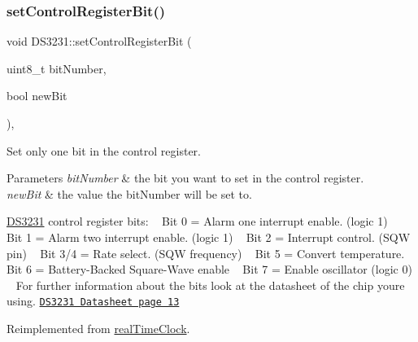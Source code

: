 \mbox{\label{class_d_s3231_a9ed1255adb58ecd03a541a4d481496c4}} 
\subsubsection{\texorpdfstring{set\+Control\+Register\+Bit()}{setControlRegisterBit()}}
{\footnotesize\ttfamily void D\+S3231\+::set\+Control\+Register\+Bit (\begin{DoxyParamCaption}\item[{uint8\+\_\+t}]{bit\+Number,  }\item[{bool}]{new\+Bit }\end{DoxyParamCaption})\hspace{0.3cm}{\ttfamily [override]}, {\ttfamily [virtual]}}



Set only one bit in the control register. 


\begin{DoxyParams}{Parameters}
{\em bit\+Number} & the bit you want to set in the control register. \\
\hline
{\em new\+Bit} & the value the bit\+Number will be set to.\\
\hline
\end{DoxyParams}
\mbox{\hyperlink{class_d_s3231}{D\+S3231}} control register bits\+: ~\newline
 Bit 0 = Alarm one interrupt enable. (logic 1) ~\newline
 Bit 1 = Alarm two interrupt enable. (logic 1) ~\newline
 Bit 2 = Interrupt control. (S\+QW pin) ~\newline
 Bit 3/4 = Rate select. (S\+QW frequency) ~\newline
 Bit 5 = Convert temperature. ~\newline
 Bit 6 = Battery-\/\+Backed Square-\/\+Wave enable ~\newline
 Bit 7 = Enable oscillator (logic 0) ~\newline
 For further information about the bits look at the datasheet of the chip you\textquotesingle{}re using. \href{https://datasheets.maximintegrated.com/en/ds/DS3231.pdf}{\tt D\+S3231 Datasheet page 13} 

Reimplemented from \mbox{\hyperlink{classreal_time_clock_af9b7db85f78d01060772bdb3b397ea3c}{real\+Time\+Clock}}.

